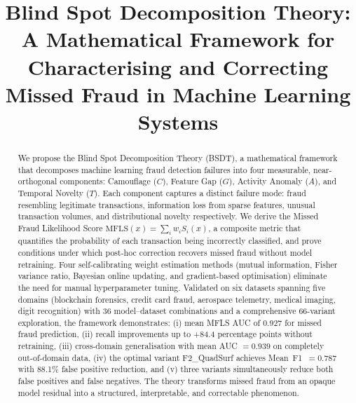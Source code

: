 \documentclass[journal]{IEEEtran}
\newcommand{\MFLS}{\mathrm{MFLS}}
\begin{document}
\title{Blind Spot Decomposition Theory: A Mathematical Framework for Characterising and Correcting Missed Fraud in Machine Learning Systems}

\author{
}

\maketitle

\begin{abstract}
We propose the Blind Spot Decomposition Theory (BSDT), a mathematical framework that decomposes machine learning fraud detection failures into four measurable, near-orthogonal components: Camouflage ($C$), Feature Gap ($G$), Activity Anomaly ($A$), and Temporal Novelty ($T$). Each component captures a distinct failure mode: fraud resembling legitimate transactions, information loss from sparse features, unusual transaction volumes, and distributional novelty respectively. We derive the Missed Fraud Likelihood Score $\MFLS(x) = \sum_i w_i S_i(x)$, a composite metric that quantifies the probability of each transaction being incorrectly classified, and prove conditions under which post-hoc correction recovers missed fraud without model retraining. Four self-calibrating weight estimation methods (mutual information, Fisher variance ratio, Bayesian online updating, and gradient-based optimisation) eliminate the need for manual hyperparameter tuning. Validated on six datasets spanning five domains (blockchain forensics, credit card fraud, aerospace telemetry, medical imaging, digit recognition) with 36 model--dataset combinations and a comprehensive 66-variant exploration, the framework demonstrates: (i) mean MFLS AUC of 0.927 for missed fraud prediction, (ii) recall improvements up to +84.4 percentage points without retraining, (iii) cross-domain generalisation with mean AUC $= 0.939$ on completely out-of-domain data, (iv) the optimal variant F2\_QuadSurf achieves Mean~F1~$= 0.787$ with 88.1\% false positive reduction, and (v) three variants simultaneously reduce both false positives and false negatives. The theory transforms missed fraud from an opaque model residual into a structured, interpretable, and correctable phenomenon.
\end{abstract}
\end{document}
